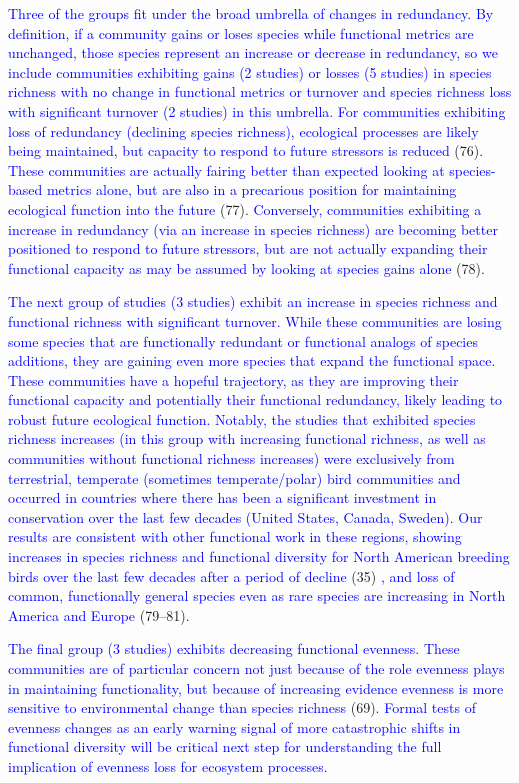 \documentclass{article}
\begin{document}
\textcolor{blue}{Three of the groups fit under the broad umbrella of changes in redundancy. By definition, if a community gains or loses species while functional metrics are unchanged, those species represent an increase or decrease in redundancy, so we include communities exhibiting gains (2 studies) or losses (5 studies) in species richness with no change in functional metrics or turnover and species richness loss with significant turnover (2 studies) in this umbrella. For communities exhibiting loss of redundancy (declining species richness), ecological processes are likely being maintained, but capacity to respond to future stressors is reduced }(76).
\textcolor{blue}{These communities are actually fairing better than expected looking at species-based metrics alone, but are also in a precarious position for maintaining ecological function into the future }(77).
\textcolor{blue}{Conversely, communities exhibiting a increase in redundancy (via an increase in species richness) are becoming better positioned to respond to future stressors, but are not actually expanding their functional capacity as may be assumed by looking at species gains alone}
(78).

\textcolor{blue}{The next group of studies (3 studies) exhibit an increase in species richness and functional richness with significant turnover. While these communities are losing some species that are functionally redundant or functional analogs of species additions, they are gaining even more species that expand the functional space. These communities have a hopeful trajectory, as they are improving their functional capacity and potentially their functional redundancy, likely leading to robust future ecological function. Notably, the studies that exhibited species richness increases (in this group with increasing functional richness, as well as communities without functional richness increases) were exclusively from terrestrial, temperate (sometimes temperate/polar) bird communities and occurred in countries where there has been a significant investment in conservation over the last few decades (United States, Canada, Sweden). Our results are consistent with other functional work in these regions, showing increases in species richness and functional diversity for North American breeding birds over the last few decades after a period of decline}
(35)
\textcolor{blue}{, and loss of common, functionally general species even as rare species are increasing in North America and Europe }
(79--81).

\textcolor{blue}{The final group (3 studies) exhibits decreasing functional evenness. These communities are of particular concern not just because of the role evenness plays in maintaining functionality, but because of increasing evidence evenness is more sensitive to environmental change than species richness}
(69).
\textcolor{blue}{Formal tests of evenness changes as an early warning signal of more catastrophic shifts in functional diversity will be critical next step for understanding the full implication of evenness loss for ecosystem processes.}
\end{document}
